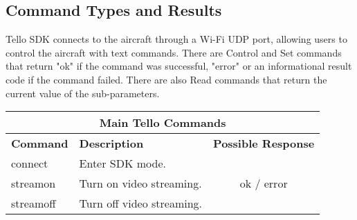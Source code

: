 \subsection{Command Types and Results}
\label{subsec:tellosdk}
Tello SDK connects to the aircraft through a Wi-Fi UDP port, allowing users to control the aircraft with text commands. There are Control and Set commands that return "ok" if the command was successful, "error" or an informational result code if the command failed. There are also Read commands that return the current value of the sub-parameters.

\begin{table}[H]
    \centering
	\begin{tabular}{@{}|llc|@{}}
		\toprule
		\multicolumn{3}{|c|}{\textbf{Main Tello Commands}}                                                                                                                                                                                                                                                                                                                      \\ \midrule
		\multicolumn{1}{|l|}{\textbf{Command}}  & \multicolumn{1}{l|}{\textbf{Description}}                                                                                                                                                                                                                                   & \multicolumn{1}{l|}{\textbf{Possible Response}} \\ \midrule
		\multicolumn{1}{|l|}{connect}           & \multicolumn{1}{l|}{Enter SDK mode.}                                                                                                                                                                                                                                        & \multirow{6}{*}{ok / error}                     \\ \cmidrule(r){1-2}
		\multicolumn{1}{|l|}{streamon}          & \multicolumn{1}{l|}{Turn on video streaming.}                                                                                                                                                                                                                               &                                                 \\ \cmidrule(r){1-2}
		\multicolumn{1}{|l|}{streamoff}         & \multicolumn{1}{l|}{Turn off video streaming.}                                                                                                                                                                                                                              &                                                 \\ \cmidrule(r){1-2}

\end{tabular}
\end{table}

